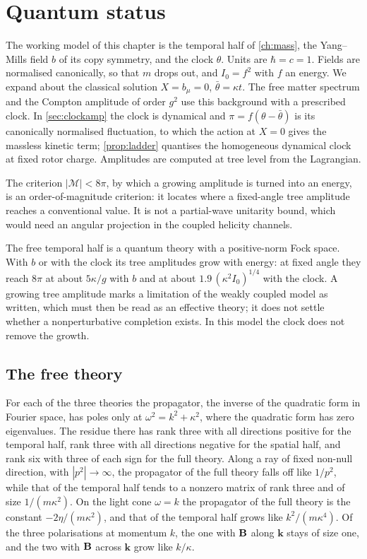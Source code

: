 \chapter{Quantum status}
\label{ch:quantum}

The working model of this chapter is the temporal half of \cref{ch:mass}, the Yang--Mills field $b$ of its copy symmetry, and the clock
$\theta$. Units are $\hbar=c=1$. Fields are normalised canonically, so that $m$ drops out, and $I_0=f^2$ with $f$ an energy. We expand
about the classical solution $X=b_\mu=0$, $\bar\theta=\kappa t$. The free matter spectrum and the Compton amplitude of order $g^2$ use
this background with a prescribed clock. In \cref{sec:clockamp} the clock is dynamical and $\pi=f(\theta-\bar\theta)$ is its canonically
normalised fluctuation, to which the action at $X=0$ gives the massless kinetic term; \cref{prop:ladder} quantises the homogeneous
dynamical clock at fixed rotor charge. Amplitudes are computed at tree level from the Lagrangian.

The criterion $|\mathcal M|<8\pi$, by which a growing amplitude is turned into an energy, is an order-of-magnitude criterion: it locates
where a fixed-angle tree amplitude reaches a conventional value. It is not a partial-wave unitarity bound, which would need an angular
projection in the coupled helicity channels.

The free temporal half is a quantum theory with a positive-norm Fock space. With $b$ or with the clock its tree amplitudes grow with
energy: at fixed angle they reach $8\pi$ at about $5\kappa/g$ with $b$ and at about $1.9\,(\kappa^2I_0)^{1/4}$ with the clock. A growing
tree amplitude marks a limitation of the weakly coupled model as written, which must then be read as an effective theory; it does not
settle whether a nonperturbative completion exists. In this model the clock does not remove the growth.

\section{The free theory}

\begin{proposition}
\label{prop:poles}
For each of the three theories the propagator, the inverse of the quadratic form in Fourier space, has poles only at
$\omega^2=k^2+\kappa^2$, where the quadratic form has zero eigenvalues. The residue there has rank three with all directions positive for
the temporal half, rank three with all directions negative for the spatial half, and rank six with three of each sign for the full theory.
Along a ray of fixed non-null direction, with $|p^2|\to\infty$, the propagator of the full theory falls off like $1/p^2$, while that of the
temporal half tends to a nonzero matrix of rank three and of size $1/(m\kappa^2)$. On the light cone $\omega=k$ the propagator of the full
theory is the constant $-2\eta/(m\kappa^2)$, and that of the temporal half grows like $k^2/(m\kappa^4)$. Of the three polarisations at
momentum $k$, the one with $\mathbf B$ along $\mathbf k$ stays of size one, and the two with $\mathbf B$ across $\mathbf k$ grow like $k/\kappa$.
\end{proposition}

